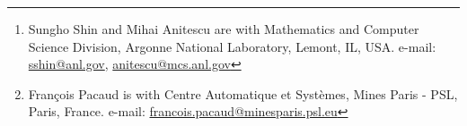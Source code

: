 
\documentclass{IEEEtran} %
\author{
  Sungho Shin, François Pacaud, Mihai Anitescu
  \thanks{
    Sungho Shin and Mihai Anitescu are with Mathematics and Computer Science Division,  Argonne National Laboratory, Lemont, IL, USA. e-mail: \url{sshin@anl.gov}, \url{anitescu@mcs.anl.gov}
  }
  \thanks{
    François Pacaud is with Centre Automatique et Systèmes, Mines Paris - PSL, Paris, France. e-mail: \url{francois.pacaud@minesparis.psl.eu}
  }
}




\makeatletter
\let\old@ps@headings\ps@headings
\let\old@ps@IEEEtitlepagestyle\ps@IEEEtitlepagestyle
\def\psccfooter#1{%
    \def\ps@headings{%
        \old@ps@headings%
        \def\@oddfoot{\strut\hfill#1\hfill\strut}%
        \def\@evenfoot{\strut\hfill#1\hfill\strut}%
    }%
    \def\ps@IEEEtitlepagestyle{%
        \old@ps@IEEEtitlepagestyle%
        \def\@oddfoot{\strut\hfill#1\hfill\strut}%
        \def\@evenfoot{\strut\hfill#1\hfill\strut}%
    }%
    \ps@headings%
}
\makeatother


\usepackage{amsmath,amssymb,amsthm,amsfonts} %
\usepackage[linktocpage=true,colorlinks=true,linkcolor=blue,citecolor=blue,urlcolor=blue]{hyperref}

